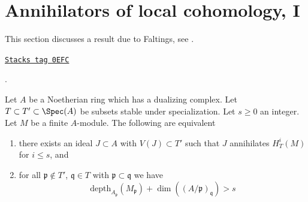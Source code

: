 \section{Annihilators of local cohomology, I}
\label{local-cohomology-section-annihilators}
This section discusses a result due to Faltings, see
\cite{Faltings-annulators}.

\begin{proposition}[Annihilator]
\label{local-cohomology-proposition-annihilator}
\href{https://stacks.math.columbia.edu/tag/0EFC}{\texttt{Stacks tag 0EFC}}

\begin{reference}
\cite{Faltings-annulators}.
\end{reference}
Let $A$ be a Noetherian ring which has a dualizing complex.
Let $T \subset T' \subset \Spec(A)$ be subsets stable under
specialization. Let $s \geq 0$ an integer. Let $M$ be a finite $A$-module.
The following are equivalent
\begin{enumerate}
\item there exists an ideal $J \subset A$ with $V(J) \subset T'$
such that $J$ annihilates $H^i_T(M)$ for $i \leq s$, and
\item for all $\mathfrak p \not \in T'$,
$\mathfrak q \in T$ with $\mathfrak p \subset \mathfrak q$
we have
$$
\text{depth}_{A_\mathfrak p}(M_\mathfrak p) +
\dim((A/\mathfrak p)_\mathfrak q) > s
$$
\end{enumerate}
\end{proposition}

